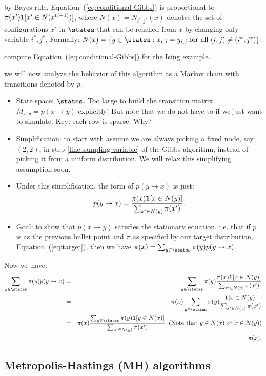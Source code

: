 \documentclass{article}
\begin{document}
 by Bayes rule, Equation~(\ref{eq:conditional-Gibbs}) is proportional to $\pi(x') {\mathbf 1}[x' \in N(x^{(i-1)})]$, where $N(x) = N_{i^*,j^*}(x)$ denotes the set of configurations $x'$ in $\states$ that can be reached from $x$ by changing only variable $i^*,j^*$. Formally: $N(x) = \{y \in \states : x_{i,j} = y_{i,j}\text{ for all }(i,j) \neq (i^*,j^*)\}$.

 compute Equation~(\ref{eq:conditional-Gibbs}) for the Ising example.

 we will now analyze the behavior of this algorithm as a Markov chain with transitions denoted by $p$.
\begin{itemize}
  \item State space: $\states$. Too large to build the transition matrix $M_{x,y} = p(x \to y)$ explicitly! But note that we do not have to if we just want to simulate. Key: each row is sparse. Why?
  \item Simplification: to start with assume we are always picking a fixed node, say $(2,2)$, in step \ref{line:sampling-variable} of the Gibbs algorithm, instead of picking it from a uniform distribution. We will relax this simplifying assumption soon.
  \item Under this simplification, the form of $p(y \to x)$ is just:
\[ p(y \to x) = \frac{ \pi(x) {\mathbf 1}[x \in N(y)]}{\sum_{x' \in N(y)} \pi(x')}. \]
  \item Goal: to show that $p(x \to y)$ satisfies the stationary equation, i.e. that if $p$ is as the previous bullet point and $\pi$ as specified by our target distribution, Equation~(\ref{eq:target}), then we have $\pi(x) = \sum_{y\in\states} \pi(y) p(y \to x).$

\end{itemize}
Now we have:
\begin{eqnarray*}
\sum_{y\in\states} \pi(y) p(y \to x) &=& \sum_{y\in\states}  \pi(y) \frac{ \pi(x) \1[x \in N(y)]}{\sum_{x' \in N(y)} \pi(x')} \\
&=& \pi(x) \sum_{y\in\states} \pi(y) \frac{  \1[x \in N(y)]}{\sum_{x' \in N(y)} \pi(x')} \\
&=& \pi(x) \frac{ \sum_{y\in\states} \pi(y) \1[y \in N(x)]}{\sum_{x' \in N(y)} \pi(x')}\;\;(\text{Note that }y\in N(x) \Leftrightarrow x\in N(y)) \\
&=& \pi(x).
\end{eqnarray*}


\subsection{Metropolis-Hastings (MH) algorithms}
\end{document}

